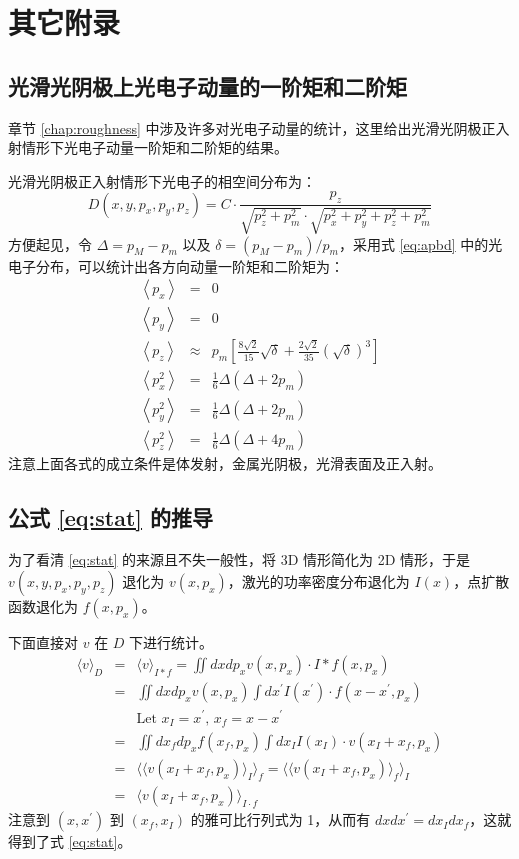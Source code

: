 \chapter{其它附录}
\section{\label{ap:gpsf}光滑光阴极上光电子动量的一阶矩和二阶矩}
章节 \ref{chap:roughness} 中涉及许多对光电子动量的统计，这里给出光滑光阴极正入射情形下光电子动量一阶矩和二阶矩的结果。

光滑光阴极正入射情形下光电子的相空间分布为：
\begin{equation}
D(x,y,p_x,p_y,p_z) = C\cdot\dfrac{p_z}{\sqrt{p_z^2+p_m^2}\cdot\sqrt{p_x^2+p_y^2+p_z^2+p_m^2}}
\label{eq:apbd}
\end{equation}
方便起见，令 $\Delta=p_M-p_m$ 以及 $\delta=(p_M-p_m)/p_m$，采用式 \ref{eq:apbd} 中的光电子分布，可以统计出各方向动量一阶矩和二阶矩为：
\begin{eqnarray}
\left\langle p_x\right\rangle &=& 0 \nonumber\\
\left\langle p_y\right\rangle &=& 0 \nonumber\\
\left\langle p_z\right\rangle & \approx & p_m\left[\frac{8\sqrt{2}}{15}\sqrt{\delta}+\frac{2\sqrt{2}}{35}\left(\sqrt{\delta}\right)^3\right]\nonumber\\
\left\langle p_x^2\right\rangle &=& \frac{1}{6} \Delta \left(\Delta + 2 p_{m}\right) \nonumber\\
\left\langle p_y^2\right\rangle &=& \frac{1}{6} \Delta \left(\Delta + 2 p_{m}\right) \nonumber\\
\left\langle p_z^2\right\rangle &=& \frac{1}{6} \Delta \left(\Delta + 4 p_{m}\right)
\end{eqnarray}
注意上面各式的成立条件是体发射，金属光阴极，光滑表面及正入射。

\section{\label{ap:stat}公式 \ref{eq:stat} 的推导}
为了看清 \ref{eq:stat} 的来源且不失一般性，将 3D 情形简化为 2D 情形，于是 $v(x, y, p_x, p_y, p_z)$ 退化为 $v(x, p_x)$，激光的功率密度分布退化为 $I(x)$，点扩散函数退化为 $f(x, p_x)$。

下面直接对 $v$ 在 $D$ 下进行统计。
\begin{eqnarray*}
\langle v \rangle_{D} &=& \langle v\rangle_{I * f} = \iint dxdp_xv(x, p_x)\cdot I*f(x, p_x)\\
&=& \iint dxdp_xv(x, p_x)\int dx^{\prime}I(x^{\prime})\cdot f(x-x^{\prime}, p_x)\\
&&\text{Let } x_I = x^{\prime}\text{, } x_f = x-x^{\prime} \\
&=& \iint dx_fdp_xf(x_f, p_x)\int dx_II(x_I)\cdot v(x_I+x_f, p_x)\\
&=& \langle\langle v(x_I+x_f, p_x)\rangle_{I}\rangle_{f} = \langle\langle v(x_I+x_f, p_x)\rangle_{f}\rangle_{I}\\[6pt]
&=& \langle v(x_I+x_f, p_x)\rangle_{I\cdot f}
\end{eqnarray*}
注意到 $(x, x^{\prime})$ 到 $(x_f, x_I)$ 的雅可比行列式为 1，从而有 $dxdx^{\prime}=dx_Idx_f$，这就得到了式 \ref{eq:stat}。
